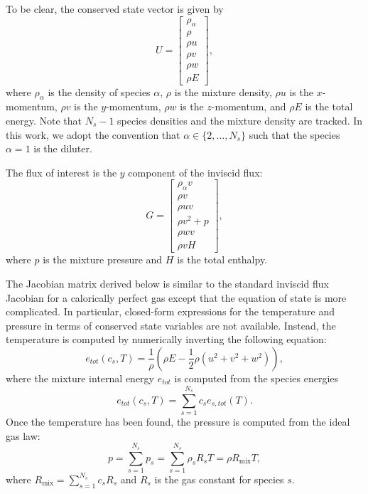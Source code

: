 To be clear, the conserved state vector is given by
%
\begin{equation*}
U = \left[ \begin{array}{c}
\rho_{\alpha} \\
\rho \\
\rho u\\
\rho v \\
\rho w \\
\rho E
\end{array} \right],
\end{equation*}
%
where $\rho_{\alpha}$ is the density of species $\alpha$, $\rho$ is
the mixture density, $\rho u$ is the $x$-momentum, $\rho v$ is the
$y$-momentum, $\rho w$ is the $z$-momentum, and $\rho E$ is the total
energy.  Note that $N_s-1$ species densities and the mixture density
are tracked.  In this work, we adopt the convention that $\alpha \in
\{2, \ldots, N_s\}$ such that the species $\alpha = 1$ is the diluter.

The flux of interest is the $y$ component of the inviscid flux:
%
\begin{equation*}
G = \left[ \begin{array}{c}
\rho_{\alpha} v \\
\rho v \\
\rho u v\\
\rho v^2 + p \\
\rho w v \\
\rho v H
\end{array} \right],
\end{equation*}
%
where $p$ is the mixture pressure and $H$ is the total enthalpy.

The Jacobian matrix derived below is similar to the standard inviscid
flux Jacobian for a calorically perfect gas except that the equation
of state is more complicated.  In particular, closed-form expressions
for the temperature and pressure in terms of conserved state variables
are not available.  Instead, the temperature is computed by
numerically inverting the following equation:
%
\begin{equation}
\label{eqn:etot_T}
e_{tot}(c_s, T) = \frac{1}{\rho} \left( \rho E - \frac{1}{2} \rho (u^2 + v^2 + w^2) \right),
\end{equation}
% 
where the mixture internal energy $e_{tot}$ is computed from the
species energies
%
\begin{equation*}
e_{tot}(c_s, T) = \sum_{s=1}^{N_s} c_s e_{s,tot}(T).
\end{equation*}
%
Once the temperature has been found, the pressure is computed from the
ideal gas law:
%
\begin{equation*}
p = \sum_{s=1}^{N_s} p_s = \sum_{s=1}^{N_s} \rho_s R_s T = \rho R_{\text{mix}} T,
\end{equation*}
%
where $R_{\text{mix}} = \sum_{s=1}^{N_s} c_s R_s$ and $R_s$ is the gas
constant for species $s$.


